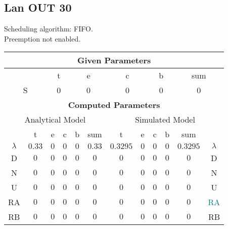 \documentclass{article}
\begin{document}
\subsection{Lan OUT 30}
Scheduling algorithm: FIFO.\\Preemption not enabled. \\\begin{table}[H]\centering\begin{tabular}{@{}c|cccc|c||cccc|c|c@{}}\toprule\multicolumn{12}{c}{\textbf{Given Parameters}}\\\midrule\multicolumn{2}{c|}{ } & \multicolumn{2}{c}{t} & \multicolumn{2}{c}{e} & \multicolumn{2}{c}{c} & \multicolumn{2}{c}{b} & \multicolumn{2}{|c}{sum} \\ \midrule\multicolumn{2}{c|}{S} & \multicolumn{2}{c}{0} & \multicolumn{2}{c}{0} & \multicolumn{2}{c}{0} & \multicolumn{2}{c}{0} & \multicolumn{2}{|c}{0}\\ \midrule\midrule\multicolumn{12}{c}{\textbf{Computed Parameters}}\\ \midrule\multicolumn{6}{c||}{Analytical Model} & \multicolumn{6}{c}{Simulated Model}\\ 
 \midrule & t & e & c & b & sum & t & e & c & b & sum &  \\ \midrule$\lambda$ &$0.33$ & $0$ & $0$ & $0$ & $0.33$ & $0.3295$ & $0$ & $0$ & $0$ & $0.3295$& $\lambda$ \\D & $0$ & $0$ & $0$ & $0$ & $0$ & $0$ & $0$ & $0$ & $0$ & $0$& D\\N & $0$ & $0$ & $0$ & $0$ & $0$ & $0$ & $0$ & $0$ & $0$ & $0$& N\\U & $0$ & $0$ & $0$ & $0$ & $0$ & $0$ & $0$ & $0$ & $0$ & $0$& U\\RA & $0$ & $0$ & $0$ & $0$ & $0$ & $0$ & $0$ & $0$ & $0$ & $0$& \textcolor{teal}{RA}\\RB & $0$ & $0$ & $0$ & $0$ & $0$ & $0$ & $0$ & $0$ & $0$ & $0$& RB\\
\bottomrule
\end{tabular}
\end{table}
\filbreak
\end{document}
